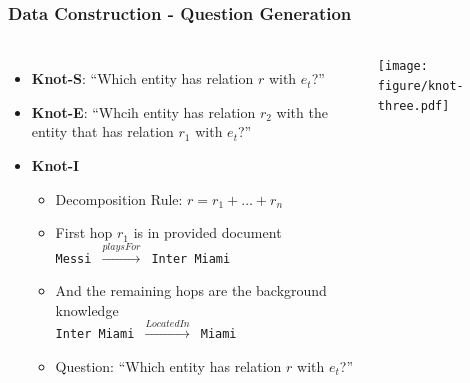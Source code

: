\documentclass{beamer}
\begin{document}
\begin{frame}
    \frametitle{Data Construction - Question Generation}
    \begin{columns}[t]
        \begin{itemize}
            \item \textbf{Knot-S}: ``Which entity has relation \texttt{$r$} with \texttt{$e_t$}?''
            \item \textbf{Knot-E}: ``Whcih entity has relation $r_2$ with the entity that has relation $r_1$ with $e_t$?''
            \item \textbf{Knot-I}
            \begin{itemize}
                \item Decomposition Rule: $r = r_1 + \dots + r_n$
                \item First hop $r_1$ is in provided document \\ \texttt{Messi $\xrightarrow{playsFor}$ Inter Miami}
                \item And the remaining hops are the background knowledge \\ \texttt{Inter Miami $\xrightarrow{LocatedIn}$ Miami}
                \item Question: ``Which entity has relation \texttt{$r$} with \texttt{$e_t$}?''
            \end{itemize}
        \end{itemize}
        \begin{center}
            \vspace*{-1cm}
            \texttt{[image: figure/knot-three.pdf]}
        \end{center}
    \end{columns}
\end{frame}
\end{document}
